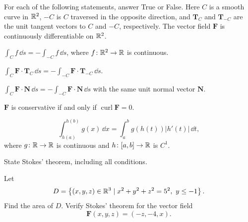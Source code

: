 \begin{problem}
For each of the following statements, answer True or False. Here $C$ is a smooth curve in $\mathbb{R}^2$, $-C$ is $C$ traversed in the opposite direction, and $\mathbf T_C$ and $\mathbf T_{-C}$ are the unit tangent vectors to $C$ and $-C$, respectively. The vector field $\mathbf F$ is continuously differentiable on $\mathbb{R}^2$.
\begin{problemchoices}
\item $\displaystyle\int_C f\,\dd s=-\int_{-C}f\,\dd s$, where $f\colon\mathbb{R}^2\to\mathbb{R}$ is continuous.
\item $\displaystyle\int_C\mathbf F\cdot\mathbf T_C\,\dd s=-\int_{-C}\mathbf F\cdot\mathbf T_{-C}\,\dd s$.
\item $\displaystyle\int_C\mathbf F\cdot\mathbf N\,\dd s=-\int_{-C}\mathbf F\cdot\mathbf N\,\dd s$ with the same unit normal vector $\mathbf N$.
\item $\mathbf F$ is conservative if and only if $\operatorname{curl}\mathbf F=0$.
\item
\[
\int_{h(a)}^{h(b)}g(x)\,\dd x
=
\int_a^b g(h(t))|h'(t)|\,\dd t,
\]
where $g\colon\mathbb{R}\to\mathbb{R}$ is continuous and $h\colon[a, b]\to\mathbb{R}$ is $C^1$.
\end{problemchoices}
\end{problem}

\begin{problem}
\begin{problemsubparts}
\item State Stokes' theorem, including all conditions.
\item Let
\[
D=\left\{(x, y, z)\in\mathbb{R}^3\mid x^2+y^2+z^2=5^2, \ y\le-1\right\}.
\]
Find the area of $D$. Verify Stokes' theorem for the vector field
\[
\mathbf F(x, y, z)=(-z, -4, x).
\]
\end{problemsubparts}
\end{problem}

